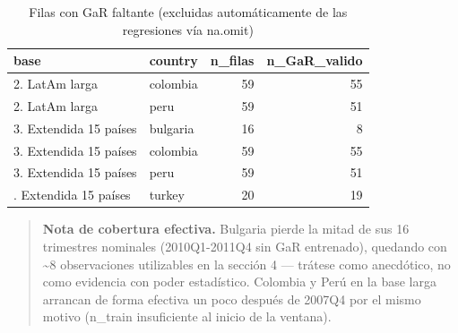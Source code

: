 \documentclass[
]{article}
\begin{document}
\begin{longtable}[t]{llrr}
\caption{\label{tab:coverage-effective}Filas con GaR faltante (excluidas automáticamente de las regresiones vía na.omit)}\\
\toprule
base & country & n\_filas & n\_GaR\_valido\\
\midrule
2. LatAm larga & colombia & 59 & 55\\
2. LatAm larga & peru & 59 & 51\\
3. Extendida 15 países & bulgaria & 16 & 8\\
3. Extendida 15 países & colombia & 59 & 55\\
3. Extendida 15 países & peru & 59 & 51\\
\addlinespace
3. Extendida 15 países & turkey & 20 & 19\\
\bottomrule
\end{longtable}
\endgroup{}

\begin{quote}
\textbf{Nota de cobertura efectiva.} Bulgaria pierde la mitad de sus 16
trimestres nominales (2010Q1-2011Q4 sin GaR entrenado), quedando con
\textasciitilde8 observaciones utilizables en la sección 4 --- trátese
como anecdótico, no como evidencia con poder estadístico. Colombia y
Perú en la base larga arrancan de forma efectiva un poco después de
2007Q4 por el mismo motivo (n\_train insuficiente al inicio de la
ventana).
\end{quote}
\end{document}

